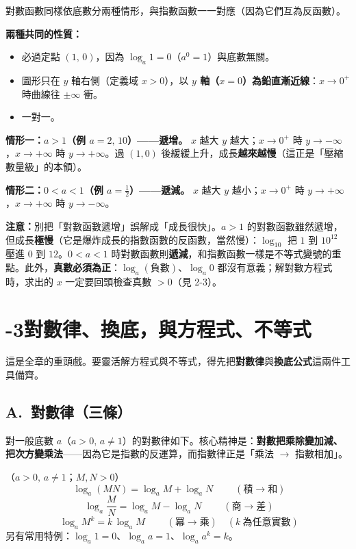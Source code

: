 \documentclass[11pt]{article}
\begin{document}
對數函數同樣依底數分兩種情形，與指數函數一一對應（因為它們互為反函數）。

\textbf{兩種共同的性質：}
\begin{itemize}\setlength{\itemsep}{1pt}
\item 必過定點 $(1,\,0)$，因為 $\log_a 1=0$（$a^0=1$）與底數無關。
\item 圖形只在 $y$ 軸右側（定義域 $x>0$），以 \textbf{$y$ 軸（$x=0$）為鉛直漸近線}：$x\to 0^{+}$ 時曲線往 $\pm\infty$ 衝。
\item 一對一。
\end{itemize}

\textbf{情形一：$a>1$（例 $a=2,\,10$）——遞增。} $x$ 越大 $y$ 越大；$x\to0^{+}$ 時 $y\to-\infty$，$x\to+\infty$ 時 $y\to+\infty$。過 $(1,0)$ 後緩緩上升，成長\textbf{越來越慢}（這正是「壓縮數量級」的本領）。

\textbf{情形二：$0<a<1$（例 $a=\tfrac12$）——遞減。} $x$ 越大 $y$ 越小；$x\to0^{+}$ 時 $y\to+\infty$，$x\to+\infty$ 時 $y\to-\infty$。

\textbf{注意：}別把「對數函數遞增」誤解成「成長很快」。$a>1$ 的對數函數雖然遞增，但成長\textbf{極慢}（它是爆炸成長的指數函數的反函數，當然慢）：$\log_{10}$ 把 $1$ 到 $10^{12}$ 壓進 $0$ 到 $12$。$0<a<1$ 時對數函數則\textbf{遞減}，和指數函數一樣是不等式變號的重點。此外，\textbf{真數必須為正}：$\log_a(\text{負數})$、$\log_a 0$ 都沒有意義；解對數方程式時，求出的 $x$ 一定要回頭檢查真數 $>0$（見 2-3）。

\section*{-3\quad 對數律、換底，與方程式、不等式}

這是全章的重頭戲。要靈活解方程式與不等式，得先把\textbf{對數律}與\textbf{換底公式}這兩件工具備齊。

\subsection*{\sffamily A.\ 對數律（三條）}

對一般底數 $a$（$a>0,\,a\ne1$）的對數律如下。核心精神是：\textbf{對數把乘除變加減、把次方變乘法}——因為它是指數的反運算，而指數律正是「乘法 $\to$ 指數相加」。

\begin{center}
（$a>0,\,a\ne1$；$M,N>0$）
$$\boxed{\;\log_a(MN)=\log_a M+\log_a N\;}\qquad(\text{積}\to\text{和})$$
$$\boxed{\;\log_a\!\frac{M}{N}=\log_a M-\log_a N\;}\qquad(\text{商}\to\text{差})$$
$$\boxed{\;\log_a M^{k}=k\,\log_a M\;}\qquad(\text{冪}\to\text{乘})\quad(k\ \text{為任意實數})$$
另有常用特例：$\log_a 1=0$、$\log_a a=1$、$\log_a a^{k}=k$。
\end{center}
\end{document}
